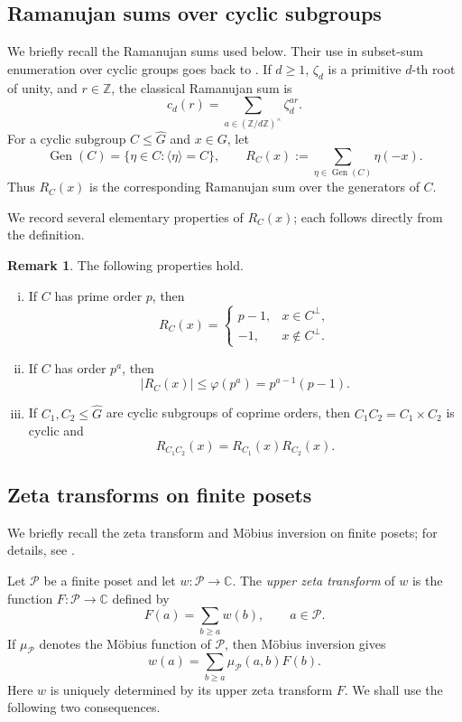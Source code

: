 \documentclass[11pt]{article}
\theoremstyle{definition}
\newtheorem{remark}[theorem]{Remark}
\DeclareMathOperator{\Gen}{Gen}
\begin{document}
\subsection{Ramanujan sums over cyclic subgroups}
We briefly recall the Ramanujan sums used below. Their use in subset-sum enumeration over cyclic groups goes back to \cite{Ramanathan1944}. If \(d\ge1\), \(\zeta_d\) is a primitive \(d\)-th root of unity, and \(r\in\mathbb Z\), the classical Ramanujan sum is
\[
c_d(r)=\sum_{a\in(\mathbb Z/d\mathbb Z)^\times}\zeta_d^{ar}.
\]
For a cyclic subgroup $C\le\widehat G$ and $x\in G$, let
\[
\Gen(C)=\{\eta\in C:\langle\eta\rangle=C\},
\qquad
R_C(x):=\sum_{\eta\in\Gen(C)}\eta(-x).
\]
Thus $R_C(x)$ is the corresponding Ramanujan sum over the generators of $C$.

We record several elementary properties of $R_C(x)$; each follows directly from the definition.

\begin{remark}\label{rem:generator-sum-properties}
	The following properties hold.
	\begin{enumerate}[(i)]
		\item If $C$ has prime order $p$, then
		$$
		R_C(x)
		=
		\begin{cases}
			p-1,&x\in C^\perp,\\
			-1,&x\notin C^\perp.
		\end{cases}
		$$
		
		\item If $C$ has order $p^a$, then
		$$
		|R_C(x)|
		\le
		\varphi(p^a)
		=
		p^{a-1}(p-1).
		$$
		
		\item If $C_1,C_2\le\widehat G$ are cyclic subgroups of coprime
		orders, then $C_1C_2=C_1\times C_2$ is cyclic and
		$$
		R_{C_1C_2}(x)
		=
		R_{C_1}(x)R_{C_2}(x).
		$$
	\end{enumerate}
\end{remark}




\subsection{Zeta transforms on finite posets}

We briefly recall the zeta transform and M\"obius inversion on finite
posets; for details, see \cite[Section~3.7]{Stanley2012}.

Let $\mathcal P$ be a finite poset and let $w:\mathcal P\to\mathbb C$.
The \emph{upper zeta transform} of $w$ is the function $F:\mathcal P\to\mathbb C$
defined by
$$
F(a)
=
\sum_{b\ge a}w(b),
\qquad
a\in\mathcal P.
$$
If $\mu_{\mathcal P}$ denotes the M\"obius function of $\mathcal P$, then
M\"obius inversion gives
$$
w(a)
=
\sum_{b\ge a}\mu_{\mathcal P}(a,b)F(b).
$$
Here $w$ is uniquely determined by its upper zeta transform $F$. We shall
use the following two consequences.
\end{document}
